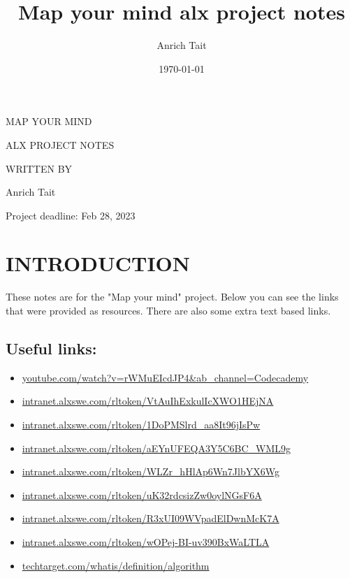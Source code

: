 \documentclass[a4paper]{article}
\author{Anrich Tait}
\date{\today}
\title{Map your mind alx project notes}
\begin{document}
\clearpage

\begin{titlepage}
\begin{center}
{\Large MAP YOUR MIND \par}
\vspace{2cm}
{\Large ALX PROJECT NOTES \par}
\vspace{2cm}
WRITTEN BY \par
\vspace{2cm}
{\Large Anrich Tait \par}
\vspace{2cm}
Project deadline: Feb 28, 2023
\end{center}
\vfill
\end{titlepage}

\tableofcontents
\clearpage

\section{INTRODUCTION}
These notes are for the "Map your mind" project. Below you can see the links that were provided as resources. There are also some extra text based links.

\subsection{Useful links:}
\begin{itemize}
    \item \url{youtube.com/watch?v=rWMuEIcdJP4&ab_channel=Codecademy}
\item \url{intranet.alxswe.com/rltoken/VtAuIhExkulIcXWO1HEjNA}
\item \url{intranet.alxswe.com/rltoken/1DoPMSlrd_aa8It96jIsPw}
\item \url{intranet.alxswe.com/rltoken/aEYnUFEQA3Y5C6BC_WML9g}
\item \url{intranet.alxswe.com/rltoken/WLZr_hHlAp6Wn7JlbYX6Wg}
\item \url{intranet.alxswe.com/rltoken/uK32rdcsizZw0oylNGsF6A}
\item \url{intranet.alxswe.com/rltoken/R3xUI09WVpadElDwnMcK7A}
\item \url{intranet.alxswe.com/rltoken/wOPej-BI-uv390BxWaLTLA}
\item \url{techtarget.com/whatis/definition/algorithm}

\end{itemize}
\newpage
\end{document}
